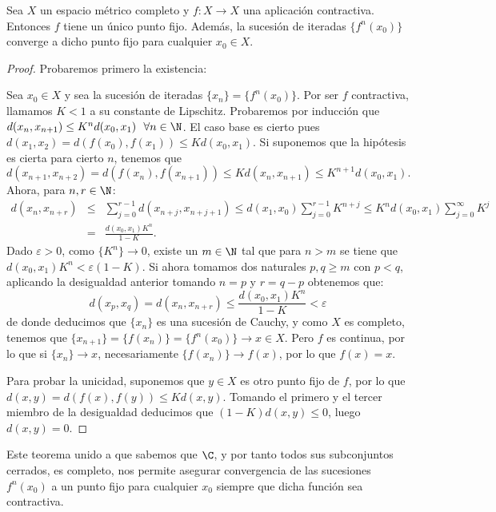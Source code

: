 \begin{teorema}
    Sea $X$ un espacio métrico completo y $f:X\longrightarrow X$ una aplicación contractiva. Entonces $f$ tiene un único punto fijo. Además, la sucesión de iteradas $\{f^n(x_0)\}$ converge a dicho punto fijo para cualquier $x_0\in X$. 
\end{teorema}
\begin{proof}
    Probaremos primero la existencia:

    Sea $x_0\in X$ y sea la sucesión de iteradas $\{x_n\}=\{f^n(x_0)\}$. Por ser $f$ contractiva, llamamos $K<1$ a su constante de Lipschitz. Probaremos por inducción que $d(x_n,x_{n+1})\leq K^n d(x_0,x_1) \ \ \forall n\in\N$.
    El caso base es cierto pues $d(x_1,x_2)=d(f(x_0),f(x_1))\leq K d(x_0,x_1)$. Si suponemos que la hipótesis es cierta para cierto $n$, tenemos que
    $$
    d(x_{n+1},x_{n+2})=d(f(x_n),f(x_{n+1}))\leq K d(x_n,x_{n+1})\leq K^{n+1}d(x_0,x_1).
    $$
    Ahora, para $n,r\in\N$:
    \begin{eqnarray*}
        d(x_n,x_{n+r}) & \leq & \sum_{j=0}^{r-1}d(x_{n+j},x_{n+j+1}) \leq d(x_1,x_0)\sum_{j=0}^{r-1}K^{n+j} \leq K^n d(x_0,x_1)\sum_{j=0}^{\infty} K^j \\
        & = & \frac{d(x_0,x_1)K^n}{1-K}.
    \end{eqnarray*}
    Dado $\varepsilon>0$, como $\{K^n\}\rightarrow 0$, existe un $m\in\N$ tal que para $n>m$ se tiene que $d(x_0,x_1)K^n<\varepsilon(1-K)$. Si ahora tomamos dos naturales $p,q\geq m$ con $p<q$, aplicando la desigualdad anterior tomando $n=p$ y $r=q-p$ obtenemos que:
    $$
    d(x_p,x_q) = d(x_n, x_{n+r}) \leq \frac{d(x_0,x_1)K^n}{1-K} < \varepsilon
    $$
    de donde deducimos que $\{x_n\}$ es una sucesión de Cauchy, y como $X$ es completo, tenemos que $\{x_{n+1}\}=\{f(x_n)\}=\{f^n(x_0)\}\rightarrow x\in X$. Pero $f$ es continua, por lo que si $\{x_n\}\rightarrow x$, necesariamente $\{f(x_n)\}\rightarrow f(x)$, por lo que $f(x)=x$.

    Para probar la unicidad, suponemos que $y\in X$ es otro punto fijo de $f$, por lo que $d(x,y) = d(f(x),f(y))\leq K d(x,y)$. Tomando el primero y el tercer miembro de la desigualdad deducimos que $(1-K)d(x,y)\leq 0$, luego $d(x,y)=0$.
\end{proof}

Este teorema unido a que sabemos que $\C$, y por tanto todos sus subconjuntos cerrados, es completo, nos permite asegurar convergencia de las sucesiones $f^n(x_0)$ a un punto fijo para cualquier $x_0$ siempre que dicha función sea contractiva.

